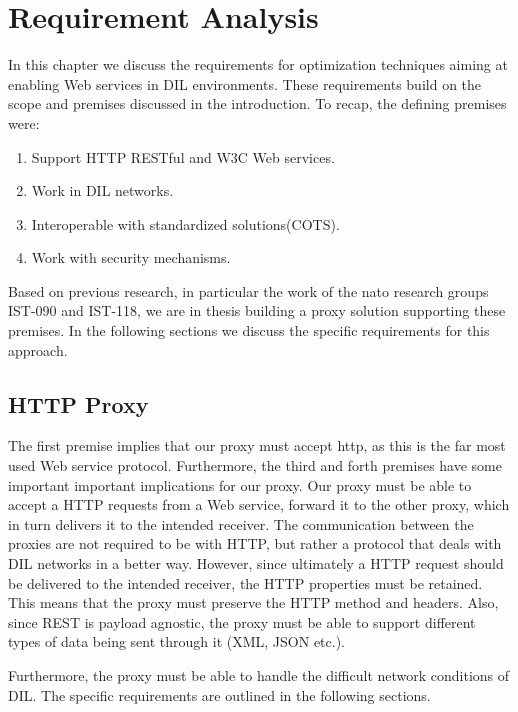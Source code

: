 \chapter{Requirement Analysis}
\label{chapter:requirements}

In this chapter we discuss the requirements for optimization techniques aiming
at enabling Web services in DIL environments. These requirements build on the
scope and premises discussed in the introduction. To recap, the defining
premises were:

\begin{enumerate}
    \item Support HTTP RESTful and W3C Web services.
    \item Work in DIL networks.
    \item Interoperable with standardized solutions(COTS).
    \item Work with security mechanisms.
\end{enumerate}

Based on previous research, in particular the work of the \gls{nato}
research groups IST-090 and IST-118, we are in thesis building a proxy solution
supporting these premises. In the following sections we discuss the specific requirements
for this approach.

\section{HTTP Proxy}

The first premise implies that our proxy must accept \gls{http}, as this is the far
most used Web service protocol. Furthermore, the third and forth premises have
some important important implications for our proxy. Our proxy must be able to
accept a HTTP requests from a Web service, forward it to the other proxy, which
in turn delivers it to the intended receiver. The communication between the
proxies are not required to be with HTTP, but rather a protocol that deals with DIL
networks in a better way. However, since ultimately a HTTP request should be
delivered to the intended receiver, the HTTP properties must be retained. This
means that the proxy must preserve the HTTP method and headers. Also, since
REST is payload agnostic, the proxy must be able to support different types of
data being sent through it (XML, JSON etc.).

Furthermore, the proxy must be able to handle the difficult network conditions
of DIL. The specific requirements are outlined in the following sections.

